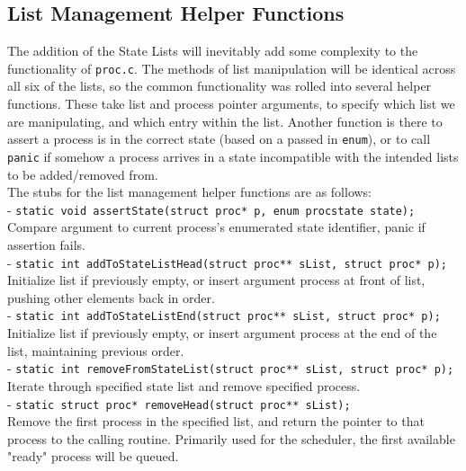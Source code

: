 \documentclass[11pt,letterpaper]{report}
\begin{document}
	\subsection{List Management Helper Functions}
	The addition of the State Lists will inevitably add some complexity to the functionality of {\tt proc.c}. The methods of list manipulation will be identical across all six of the lists, so the common functionality was rolled into several helper functions. These take list and process pointer arguments, to specify which list we are manipulating, and which entry within the list. Another function is there to assert a process is in the correct state (based on a passed in {\tt enum}), or to call {\tt panic} if somehow a process arrives in a state incompatible with the intended lists to be added/removed from.\\
	The stubs for the list management helper functions are as follows:\\
	- {\tt static void assertState(struct proc* p, enum procstate state);}\\
	Compare argument to current process's enumerated state identifier, panic if assertion fails.\\
	- {\tt static int addToStateListHead(struct proc** sList, struct proc* p);}\\
	Initialize list if previously empty, or insert argument process at front of list, pushing other elements back in order.\\
	- {\tt static int addToStateListEnd(struct proc** sList, struct proc* p);}\\
	Initialize list if previously empty, or insert argument process at the end of the list, maintaining previous order.\\
	- {\tt static int removeFromStateList(struct proc** sList, struct proc* p);}\\
	Iterate through specified state list and remove specified process.\\
	- {\tt static struct proc* removeHead(struct proc** sList);}\\
	Remove the first process in the specified list, and return the pointer to that process to the calling routine. Primarily used for the scheduler, the first available "ready" process will be queued.\\
	
\end{document}
